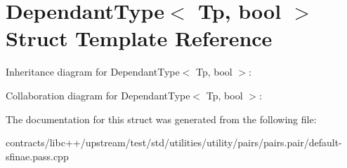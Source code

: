 \hypertarget{struct_dependant_type}{}\section{Dependant\+Type$<$ Tp, bool $>$ Struct Template Reference}
\label{struct_dependant_type}


Inheritance diagram for Dependant\+Type$<$ Tp, bool $>$\+:


Collaboration diagram for Dependant\+Type$<$ Tp, bool $>$\+:


The documentation for this struct was generated from the following file\+:\begin{DoxyCompactItemize}
\item 
contracts/libc++/upstream/test/std/utilities/utility/pairs/pairs.\+pair/default-\/sfinae.\+pass.\+cpp\end{DoxyCompactItemize}
